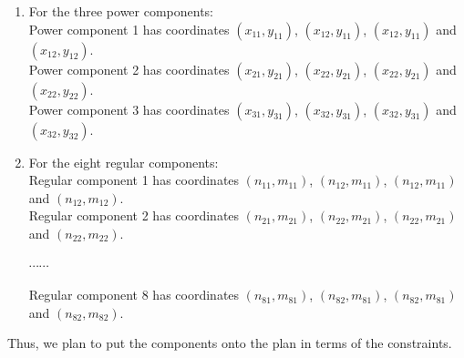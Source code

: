 \documentclass[11pt]{article}
\begin{document}
\begin{enumerate}
  \item For the three power components:\\
  Power component 1 has coordinates $(x_{11}, y_{11})$, $(x_{12}, y_{11})$, $(x_{12}, y_{11})$ and $(x_{12}, y_{12})$.\\
  Power component 2 has coordinates $(x_{21}, y_{21})$, $(x_{22}, y_{21})$, $(x_{22}, y_{21})$ and $(x_{22}, y_{22})$.\\
  Power component 3 has coordinates $(x_{31}, y_{31})$, $(x_{32}, y_{31})$, $(x_{32}, y_{31})$ and $(x_{32}, y_{32})$.
  \item For the eight regular components:\\
  Regular component 1 has coordinates $(n_{11}, m_{11})$, $(n_{12}, m_{11})$, $(n_{12}, m_{11})$ and $(n_{12}, m_{12})$.\\
  Regular component 2 has coordinates $(n_{21}, m_{21})$, $(n_{22}, m_{21})$, $(n_{22}, m_{21})$ and $(n_{22}, m_{22})$.

  $\cdots \cdots$

  Regular component 8 has coordinates $(n_{81}, m_{81})$, $(n_{82}, m_{81})$, $(n_{82}, m_{81})$ and $(n_{82}, m_{82})$.
\end{enumerate}
Thus, we plan to put the components onto the plan in terms of the constraints.
\end{document}

